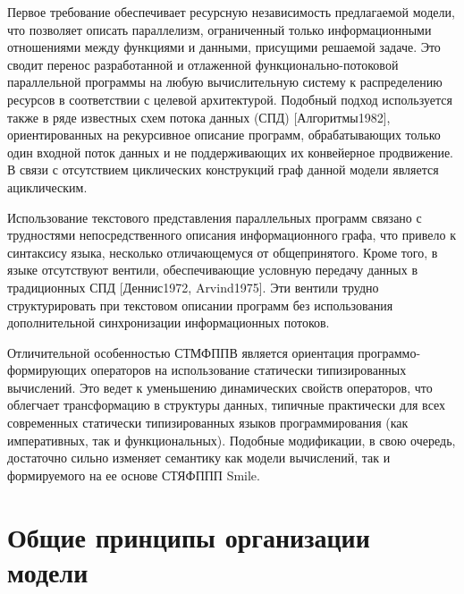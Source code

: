 Первое требование обеспечивает ресурсную независимость предлагаемой модели, что позволяет описать параллелизм, ограниченный только информационными отношениями между функциями и данными, присущими решаемой задаче. Это сводит перенос разработанной и отлаженной функционально-потоковой параллельной программы на любую вычислительную систему к распределению ресурсов в соответствии с целевой архитектурой. Подобный подход используется также в ряде известных схем потока данных (СПД) [Алгоритмы1982], ориентированных на рекурсивное описание программ, обрабатывающих только один входной поток данных и не поддерживающих их конвейерное продвижение. В связи с отсутствием циклических конструкций граф данной модели является ациклическим.

Использование текстового представления параллельных программ связано с трудностями непосредственного описания информационного графа, что привело к синтаксису языка, несколько отличающемуся от общепринятого. Кроме того, в языке отсутствуют вентили, обеспечивающие условную передачу данных в традиционных СПД [Деннис1972, Arvind1975]. Эти вентили трудно структурировать при текстовом описании программ без использования дополнительной синхронизации информационных потоков.

Отличительной особенностью СТМФППВ является ориентация программо-формирующих операторов на использование статически типизированных вычислений. Это ведет к уменьшению динамических свойств операторов, что облегчает трансформацию в структуры данных, типичные практически для всех современных статически типизированных языков программирования (как императивных, так и функциональных). Подобные модификации, в свою очередь, достаточно сильно изменяет семантику как модели вычислений, так и формируемого на ее основе СТЯФППП Smile.


\section{Общие принципы организации модели}

